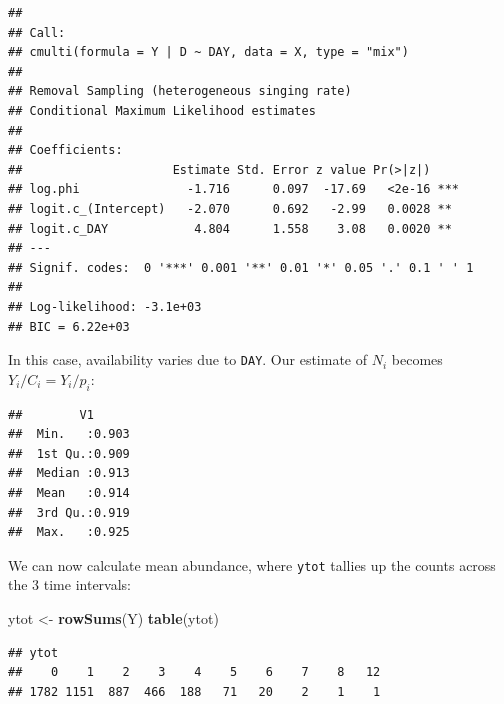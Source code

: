 \documentclass[12pt,]{book}
\newenvironment{Shaded}{\begin{snugshade}}{\end{snugshade}}
\newcommand{\DecValTok}[1]{\textcolor[rgb]{0.00,0.00,0.81}{#1}}
\newcommand{\KeywordTok}[1]{\textcolor[rgb]{0.13,0.29,0.53}{\textbf{#1}}}
\newcommand{\NormalTok}[1]{#1}
\newcommand{\OperatorTok}[1]{\textcolor[rgb]{0.81,0.36,0.00}{\textbf{#1}}}
\newcommand{\StringTok}[1]{\textcolor[rgb]{0.31,0.60,0.02}{#1}}
\begin{document}
\begin{verbatim}
## 
## Call:
## cmulti(formula = Y | D ~ DAY, data = X, type = "mix")
## 
## Removal Sampling (heterogeneous singing rate)
## Conditional Maximum Likelihood estimates
## 
## Coefficients:
##                     Estimate Std. Error z value Pr(>|z|)    
## log.phi               -1.716      0.097  -17.69   <2e-16 ***
## logit.c_(Intercept)   -2.070      0.692   -2.99   0.0028 ** 
## logit.c_DAY            4.804      1.558    3.08   0.0020 ** 
## ---
## Signif. codes:  0 '***' 0.001 '**' 0.01 '*' 0.05 '.' 0.1 ' ' 1 
## 
## Log-likelihood: -3.1e+03 
## BIC = 6.22e+03
\end{verbatim}

In this case, availability varies due to \texttt{DAY}.
Our estimate of \(N_i\) becomes \(Y_i/C_i=Y_i/p_i\):

\begin{Shaded}
\end{Shaded}

\begin{verbatim}
##        V1       
##  Min.   :0.903  
##  1st Qu.:0.909  
##  Median :0.913  
##  Mean   :0.914  
##  3rd Qu.:0.919  
##  Max.   :0.925
\end{verbatim}

We can now calculate mean abundance, where \texttt{ytot} tallies up the counts
across the 3 time intervals:

\begin{Shaded}
\begin{Highlighting}[]
\NormalTok{ytot <-}\StringTok{ }\KeywordTok{rowSums}\NormalTok{(Y)}
\KeywordTok{table}\NormalTok{(ytot)}
\end{Highlighting}
\end{Shaded}

\begin{verbatim}
## ytot
##    0    1    2    3    4    5    6    7    8   12 
## 1782 1151  887  466  188   71   20    2    1    1
\end{verbatim}
\end{document}

